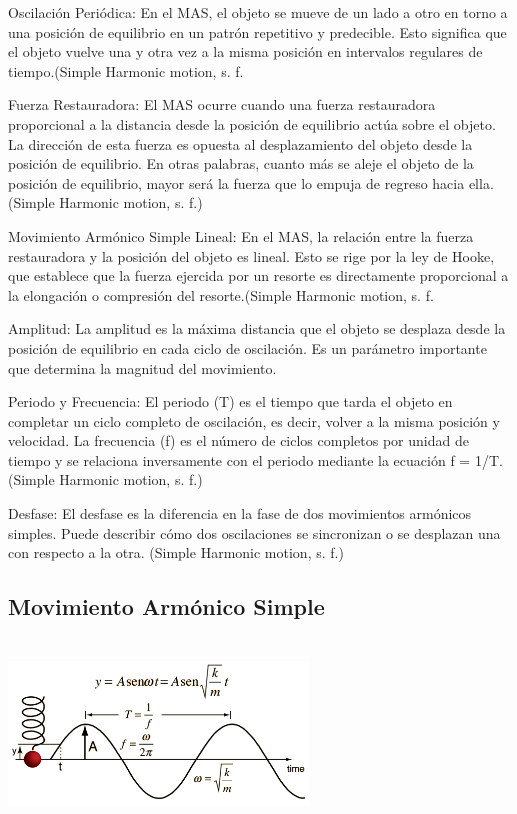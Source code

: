 \documentclass[10pt]{article}
\begin{document}
\begin{multicols}{2}
Oscilación Periódica: En el MAS, el objeto se mueve de un lado a otro en torno a una posición de equilibrio en un patrón repetitivo y predecible. Esto significa que el objeto vuelve una y otra vez a la misma posición en intervalos regulares de tiempo.(Simple Harmonic motion, s. f.

Fuerza Restauradora: El MAS ocurre cuando una fuerza restauradora proporcional a la distancia desde la posición de equilibrio actúa sobre el objeto. La dirección de esta fuerza es opuesta al desplazamiento del objeto desde la posición de equilibrio. En otras palabras, cuanto más se aleje el objeto de la posición de equilibrio, mayor será la fuerza que lo empuja de regreso hacia ella.(Simple Harmonic motion, s. f.)

Movimiento Armónico Simple Lineal: En el MAS, la relación entre la fuerza restauradora y la posición del objeto es lineal. Esto se rige por la ley de Hooke, que establece que la fuerza ejercida por un resorte es directamente proporcional a la elongación o compresión del resorte.(Simple Harmonic motion, s. f.

Amplitud: La amplitud es la máxima distancia que el objeto se desplaza desde la posición de equilibrio en cada ciclo de oscilación. Es un parámetro importante que determina la magnitud del movimiento.

Periodo y Frecuencia: El periodo (T) es el tiempo que tarda el objeto en completar un ciclo completo de oscilación, es decir, volver a la misma posición y velocidad. La frecuencia (f) es el número de ciclos completos por unidad de tiempo y se relaciona inversamente con el periodo mediante la ecuación f = 1/T.(Simple Harmonic motion, s. f.)

Desfase: El desfase es la diferencia en la fase de dos movimientos armónicos simples. Puede describir cómo dos oscilaciones se sincronizan o se desplazan una con respecto a la otra. (Simple Harmonic motion, s. f.)
\subsection{ Movimiento Armónico Simple}
\begin{center}
	\includegraphics[width=8cm, height=5cm]{Imagenes/mas.png}
\end{center}




\end{multicols}
\end{document}
